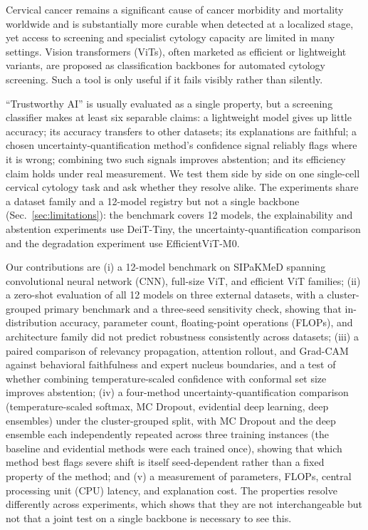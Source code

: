 \documentclass[12pt,letterpaper]{article}
\begin{document}
Cervical cancer remains a significant cause of cancer morbidity and mortality worldwide\cite{sung2021} and is substantially more curable when detected at a localized stage, yet access to screening\cite{dykens2020} and specialist cytology capacity\cite{walsh2024} are limited in many settings.
Vision transformers (ViTs), often marketed as efficient or lightweight variants, are proposed as classification backbones for automated cytology screening. Such a tool is only useful if it fails visibly rather than silently.

``Trustworthy AI'' is usually evaluated as a single property, but a screening classifier makes at least six separable claims: a lightweight model gives up little accuracy; its accuracy transfers to other datasets; its explanations are faithful; a chosen uncertainty-quantification method's confidence signal reliably flags where it is wrong; combining two such signals improves abstention; and its efficiency claim holds under real measurement. We test them side by side on one single-cell cervical cytology task and ask whether they resolve alike. The experiments share a dataset family and a 12-model registry but not a single backbone (Sec.~\ref{sec:limitations}): the benchmark covers 12 models, the explainability and abstention experiments use DeiT-Tiny, the uncertainty-quantification comparison and the degradation experiment use EfficientViT-M0.

Our contributions are (i) a 12-model benchmark on SIPaKMeD spanning convolutional neural network (CNN), full-size ViT, and efficient ViT families; (ii) a zero-shot evaluation of all 12 models on three external datasets, with a cluster-grouped primary benchmark and a three-seed sensitivity check, showing that in-distribution accuracy, parameter count, floating-point operations (FLOPs), and architecture family did not predict robustness consistently across datasets; (iii) a paired comparison of relevancy propagation, attention rollout, and Grad-CAM against behavioral faithfulness and expert nucleus boundaries, and a test of whether combining temperature-scaled confidence with conformal set size improves abstention; (iv) a four-method uncertainty-quantification comparison (temperature-scaled softmax, MC Dropout, evidential deep learning, deep ensembles) under the cluster-grouped split, with MC Dropout and the deep ensemble each independently repeated across three training instances (the baseline and evidential methods were each trained once), showing that which method best flags severe shift is itself seed-dependent rather than a fixed property of the method; and (v) a measurement of parameters, FLOPs, central processing unit (CPU) latency, and explanation cost. The properties resolve differently across experiments, which shows that they are not interchangeable but not that a joint test on a single backbone is necessary to see this.
\end{document}
